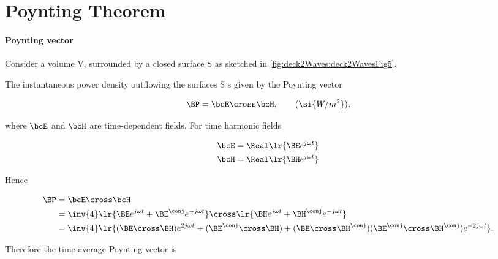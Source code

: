 \section{Poynting Theorem}

\paragraph{Poynting vector}

Consider a volume V, surrounded by a closed surface S as sketched in \cref{fig:deck2Waves:deck2WavesFig5}.


The instantaneous power density outflowing the surfaces S s given by the Poynting vector

\begin{equation}\label{eqn:uwavesLecture2:1120}
\BP = \bcE \cross \bcH, \qquad (\si{W/m^2}),
\end{equation}

where \( \bcE \) and \( \bcH \) are time-dependent fields.  For time harmonic fields

\begin{equation}\label{eqn:uwavesLecture2:1140}
\begin{aligned}
\bcE &= \Real \lr{ \BE e^{j \omega t} } \\
\bcH &= \Real \lr{ \BH e^{j \omega t} }
\end{aligned}
\end{equation}

Hence

\begin{equation}\label{eqn:uwavesLecture2:1160}
\begin{aligned}
\BP
&= \bcE \cross \bcH
\\ &= \inv{4}
\lr{ \BE e^{j \omega t} +  \BE^\conj e^{-j \omega t} }
\cross
\lr{ \BH e^{j \omega t} +  \BH^\conj e^{-j \omega t} }
\\ &=
\inv{4}
\lr{
(\BE \cross \BH) e^{2 j \omega t}
+ (\BE^\conj \cross \BH)
+ (\BE \cross \BH^\conj)
(\BE^\conj \cross \BH^\conj) e^{-2 j \omega t}
}.
\end{aligned}
\end{equation}

Therefore the time-average Poynting vector is


